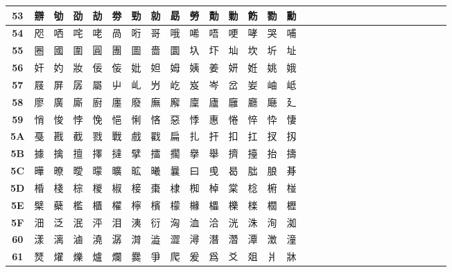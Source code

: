 \begin{table}[H]
\begin{tabular}{|Sc|Sc|Sc|Sc|Sc|Sc|Sc|Sc|Sc|Sc|Sc|Sc|Sc|Sc|Sc|}
\textbf{53} & 辧 & 劬 & 劭 & 劼 & 劵 & 勁 & 勍 & 勗 & 勞 & 勣 & 勦 & 飭 & 勠 & 勳 \\ \hline
\textbf{54} & 咫 & 哂 & 咤 & 咾 & 咼 & 哘 & 哥 & 哦 & 唏 & 唔 & 哽 & 哮 & 哭 & 哺 \\ \hline
\textbf{55} & 圈 & 國 & 圍 & 圓 & 團 & 圖 & 嗇 & 圜 & 圦 & 圷 & 圸 & 坎 & 圻 & 址 \\ \hline
\textbf{56} & 奸 & 妁 & 妝 & 佞 & 侫 & 妣 & 妲 & 姆 & 姨 & 姜 & 妍 & 姙 & 姚 & 娥 \\ \hline
\textbf{57} & 屐 & 屏 & 孱 & 屬 & 屮 & 乢 & 屶 & 屹 & 岌 & 岑 & 岔 & 妛 & 岫 & 岻 \\ \hline
\textbf{58} & 廖 & 廣 & 廝 & 廚 & 廛 & 廢 & 廡 & 廨 & 廩 & 廬 & 廱 & 廳 & 廰 & 廴 \\ \hline
\textbf{59} & 悄 & 悛 & 悖 & 悗 & 悒 & 悧 & 悋 & 惡 & 悸 & 惠 & 惓 & 悴 & 忰 & 悽 \\ \hline
\textbf{5A} & 戞 & 戡 & 截 & 戮 & 戰 & 戲 & 戳 & 扁 & 扎 & 扞 & 扣 & 扛 & 扠 & 扨 \\ \hline
\textbf{5B} & 據 & 擒 & 擅 & 擇 & 撻 & 擘 & 擂 & 擱 & 擧 & 舉 & 擠 & 擡 & 抬 & 擣 \\ \hline
\textbf{5C} & 曄 & 暸 & 曖 & 曚 & 曠 & 昿 & 曦 & 曩 & 曰 & 曵 & 曷 & 朏 & 朖 & 朞 \\ \hline
\textbf{5D} & 棔 & 棧 & 棕 & 椶 & 椒 & 椄 & 棗 & 棣 & 椥 & 棹 & 棠 & 棯 & 椨 & 椪 \\ \hline
\textbf{5E} & 檗 & 蘗 & 檻 & 櫃 & 櫂 & 檸 & 檳 & 檬 & 櫞 & 櫑 & 櫟 & 檪 & 櫚 & 櫪 \\ \hline
\textbf{5F} & 沺 & 泛 & 泯 & 泙 & 泪 & 洟 & 衍 & 洶 & 洫 & 洽 & 洸 & 洙 & 洵 & 洳 \\ \hline
\textbf{60} & 漾 & 漓 & 滷 & 澆 & 潺 & 潸 & 澁 & 澀 & 潯 & 潛 & 濳 & 潭 & 澂 & 潼 \\ \hline
\textbf{61} & 燹 & 燿 & 爍 & 爐 & 爛 & 爨 & 爭 & 爬 & 爰 & 爲 & 爻 & 爼 & 爿 & 牀 \\ \hline
\end{tabular}
\end{table}

